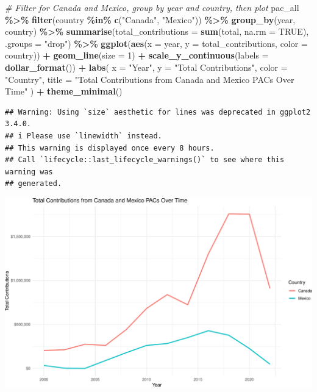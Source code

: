 \documentclass[
]{article}
\newenvironment{Shaded}{\begin{snugshade}}{\end{snugshade}}
\newcommand{\AttributeTok}[1]{\textcolor[rgb]{0.13,0.29,0.53}{#1}}
\newcommand{\CommentTok}[1]{\textcolor[rgb]{0.56,0.35,0.01}{\textit{#1}}}
\newcommand{\ConstantTok}[1]{\textcolor[rgb]{0.56,0.35,0.01}{#1}}
\newcommand{\DecValTok}[1]{\textcolor[rgb]{0.00,0.00,0.81}{#1}}
\newcommand{\FunctionTok}[1]{\textcolor[rgb]{0.13,0.29,0.53}{\textbf{#1}}}
\newcommand{\NormalTok}[1]{#1}
\newcommand{\SpecialCharTok}[1]{\textcolor[rgb]{0.81,0.36,0.00}{\textbf{#1}}}
\newcommand{\StringTok}[1]{\textcolor[rgb]{0.31,0.60,0.02}{#1}}
\begin{document}
\begin{Shaded}
\begin{Highlighting}[]
\CommentTok{\# Filter for Canada and Mexico, group by year and country, then plot}
\NormalTok{pac\_all }\SpecialCharTok{\%\textgreater{}\%}
  \FunctionTok{filter}\NormalTok{(country }\SpecialCharTok{\%in\%} \FunctionTok{c}\NormalTok{(}\StringTok{"Canada"}\NormalTok{, }\StringTok{"Mexico"}\NormalTok{)) }\SpecialCharTok{\%\textgreater{}\%}
  \FunctionTok{group\_by}\NormalTok{(year, country) }\SpecialCharTok{\%\textgreater{}\%}
  \FunctionTok{summarise}\NormalTok{(}\AttributeTok{total\_contributions =} \FunctionTok{sum}\NormalTok{(total, }\AttributeTok{na.rm =} \ConstantTok{TRUE}\NormalTok{), }\AttributeTok{.groups =} \StringTok{"drop"}\NormalTok{) }\SpecialCharTok{\%\textgreater{}\%}
  \FunctionTok{ggplot}\NormalTok{(}\FunctionTok{aes}\NormalTok{(}\AttributeTok{x =}\NormalTok{ year, }\AttributeTok{y =}\NormalTok{ total\_contributions, }\AttributeTok{color =}\NormalTok{ country)) }\SpecialCharTok{+}
  \FunctionTok{geom\_line}\NormalTok{(}\AttributeTok{size =} \DecValTok{1}\NormalTok{) }\SpecialCharTok{+}
  \FunctionTok{scale\_y\_continuous}\NormalTok{(}\AttributeTok{labels =} \FunctionTok{dollar\_format}\NormalTok{()) }\SpecialCharTok{+}
  \FunctionTok{labs}\NormalTok{(}
    \AttributeTok{x =} \StringTok{"Year"}\NormalTok{,}
    \AttributeTok{y =} \StringTok{"Total Contributions"}\NormalTok{,}
    \AttributeTok{color =} \StringTok{"Country"}\NormalTok{,}
    \AttributeTok{title =} \StringTok{"Total Contributions from Canada and Mexico PACs Over Time"}
\NormalTok{  ) }\SpecialCharTok{+}
  \FunctionTok{theme\_minimal}\NormalTok{()}
\end{Highlighting}
\end{Shaded}

\begin{verbatim}
## Warning: Using `size` aesthetic for lines was deprecated in ggplot2 3.4.0.
## i Please use `linewidth` instead.
## This warning is displayed once every 8 hours.
## Call `lifecycle::last_lifecycle_warnings()` to see where this warning was
## generated.
\end{verbatim}

\includegraphics[width=0.8\linewidth]{hw-06-money-in-politics_files/figure-latex/canada-mexico-plot-1}
\end{document}
